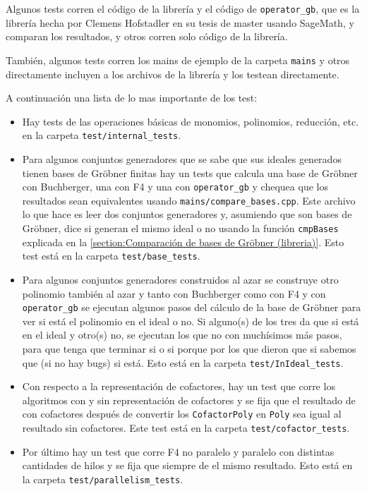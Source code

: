 \documentclass[12pt]{report}
\theoremstyle{customstyle}
\theoremstyle{factstyle}
\begin{document}
Algunos tests corren el código de la librería y el código de \texttt{operator\_gb}, que es la librería hecha por Clemens Hofstadler en su tesis de master \cite{thesis:Hof20} usando SageMath, y comparan los resultados, y otros corren solo código de la librería.

También, algunos tests corren los mains de ejemplo de la carpeta \texttt{mains} y otros directamente incluyen a los archivos de la librería y los testean directamente.

A continuación una lista de lo mas importante de los test:

\begin{itemize}
  \item Hay tests de las operaciones básicas de monomios, polinomios, reducción, etc. en la carpeta \texttt{test/internal\_tests}.
  \item Para algunos conjuntos generadores que se sabe que sus ideales generados tienen bases de Gröbner finitas hay un tests que calcula una base de Gröbner con Buchberger, una con F4 y una con \texttt{operator\_gb} y chequea que los resultados sean equivalentes usando \texttt{mains/compare\_bases.cpp}. Este archivo lo que hace es leer dos conjuntos generadores y, asumiendo que son bases de Gröbner, dice si generan el mismo ideal o no usando la función \texttt{cmpBases} explicada en la \cref{section:Comparación de bases de Gröbner (libreria)}. Esto test está en la carpeta \texttt{test/base\_tests}.
  \item Para algunos conjuntos generadores construidos al azar se construye otro polinomio también al azar y tanto con Buchberger como con F4 y con \texttt{operator\_gb} se ejecutan algunos pasos del cálculo de la base de Gröbner para ver si está el polinomio en el ideal o no. Si alguno(s) de los tres da que si está en el ideal y otro(s) no, se ejecutan los que no con muchísimos más pasos, para que tenga que terminar si o si porque por los que dieron que si sabemos que (si no hay bugs) si está. Esto está en la carpeta \texttt{test/InIdeal\_tests}. %
  \item Con respecto a la representación de cofactores, hay un test que corre los algoritmos con y sin representación de cofactores y se fija que el resultado de con cofactores después de convertir los \texttt{CofactorPoly} en \texttt{Poly} sea igual al resultado sin cofactores. Este test está en la carpeta \texttt{test/cofactor\_tests}.
  \item Por último hay un test que corre F4 no paralelo y paralelo con distintas cantidades de hilos y se fija que siempre de el mismo resultado. Esto está en la carpeta \texttt{test/parallelism\_tests}.
\end{itemize}
\end{document}
